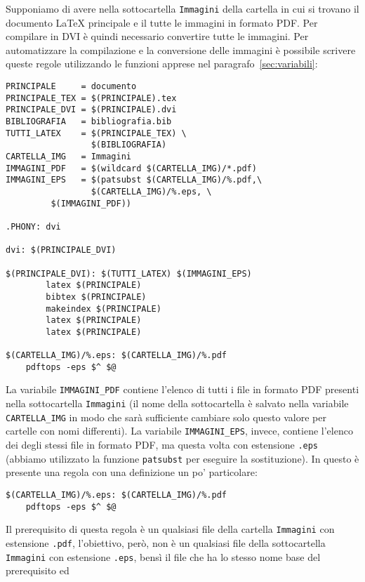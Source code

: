 Supponiamo di avere nella sottocartella \texttt{Immagini} della cartella in cui
si trovano il documento \LaTeX{}
principale e il  tutte le immagini in formato \textsc{PDF}.
Per compilare in \textsc{DVI} è quindi necessario convertire tutte le immagini.
Per automatizzare la compilazione e la conversione delle immagini è possibile
scrivere queste regole utilizzando le funzioni apprese nel
paragrafo~\ref{sec:variabili}:
\begin{lstlisting}[caption={\filestyle{Makefile} in cui le immagini \textsc{PDF}
vengono convertite in \textsc{EPS} nella compilazione con \LaTeX.},
label=lst:pdf-eps]
PRINCIPALE     = documento
PRINCIPALE_TEX = $(PRINCIPALE).tex
PRINCIPALE_DVI = $(PRINCIPALE).dvi
BIBLIOGRAFIA   = bibliografia.bib
TUTTI_LATEX    = $(PRINCIPALE_TEX) \
                 $(BIBLIOGRAFIA)
CARTELLA_IMG   = Immagini
IMMAGINI_PDF   = $(wildcard $(CARTELLA_IMG)/*.pdf)
IMMAGINI_EPS   = $(patsubst $(CARTELLA_IMG)/%.pdf,\
                 $(CARTELLA_IMG)/%.eps, \
		 $(IMMAGINI_PDF))

.PHONY: dvi

dvi: $(PRINCIPALE_DVI)

$(PRINCIPALE_DVI): $(TUTTI_LATEX) $(IMMAGINI_EPS)
        latex $(PRINCIPALE)
        bibtex $(PRINCIPALE)
        makeindex $(PRINCIPALE)
        latex $(PRINCIPALE)
        latex $(PRINCIPALE)

$(CARTELLA_IMG)/%.eps: $(CARTELLA_IMG)/%.pdf
	pdftops -eps $^ $@
\end{lstlisting} %
La variabile \texttt{IMMAGINI\_PDF} contiene l'elenco di tutti i file in formato
\textsc{PDF} presenti nella sottocartella \texttt{Immagini} (il nome della
sottocartella è salvato nella variabile \texttt{CARTELLA\_IMG} in modo che sarà
sufficiente cambiare solo questo valore per cartelle con nomi differenti).  La
variabile \texttt{IMMAGINI\_EPS}, invece, contiene l'elenco dei degli stessi
file in formato \textsc{PDF}, ma questa volta con estensione \texttt{.eps}
(abbiamo utilizzato la funzione \texttt{patsubst} per eseguire la sostituzione).
In questo \filestyle{Makefile} è presente una regola con una definizione un po'
particolare:
\begin{lstlisting}
$(CARTELLA_IMG)/%.eps: $(CARTELLA_IMG)/%.pdf
	pdftops -eps $^ $@
\end{lstlisting} %
Il prerequisito di questa regola è un qualsiasi file della cartella
\texttt{Immagini} con estensione \texttt{.pdf}, l'obiettivo, però, non è un
qualsiasi file della sottocartella \texttt{Immagini} con estensione
\texttt{.eps}, bensì il file che ha lo stesso nome base del prerequisito ed
